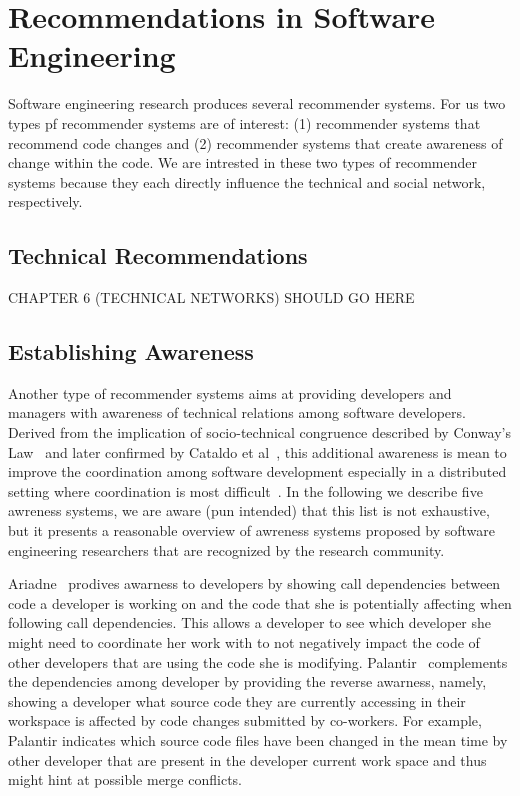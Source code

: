 \section{Recommendations in Software Engineering}
Software engineering research produces several recommender systems.
For us two types pf recommender systems are of interest:
(1) recommender systems that recommend code changes
and (2) recommender systems that create awareness of change within the code.
We are intrested in these two types of recommender systems because they each directly influence the technical and social network, respectively.

\subsection{Technical Recommendations}

CHAPTER 6 (TECHNICAL NETWORKS) SHOULD GO HERE

\subsection{Establishing Awareness}
Another type of recommender systems aims at providing developers and managers with awareness of technical relations among software developers.
Derived from the implication of socio-technical congruence described by Conway's Law~\cite{conway:datamination:1968} and later confirmed by Cataldo et al~\cite{cataldo:cscw:2006}, this additional awareness is mean to improve the coordination among software development especially in a distributed setting where coordination is most difficult~\cite{olson:hci:2000}.
In the following we describe five awreness systems, we are aware (pun intended) that this list is not exhaustive, but it presents a reasonable overview of awreness systems proposed by software engineering researchers that are recognized by the research community.

Ariadne~\cite{trainer2005:ariadne} prodives awarness to developers by showing call dependencies between code a developer is working on and the code that she is potentially affecting when following call dependencies.
This allows a developer to see which developer she might need to coordinate her work with to not negatively impact the code of other developers that are using the code she is modifying.
%
Palantir~\cite{sarma:cscw:2002} complements the dependencies among developer by providing the reverse awarness, namely, showing a developer what source code they are currently accessing in their workspace is affected by code changes submitted by co-workers.
For example, Palantir indicates which source code files have been changed in the mean time by other developer that are present in the developer current work space and thus might hint at possible merge conflicts.

